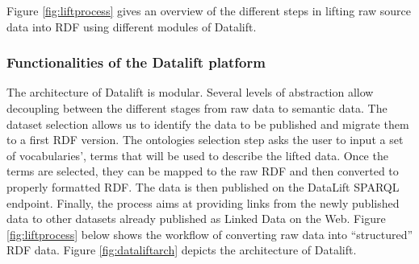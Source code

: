 \begin{itemize}
Figure \ref{fig:liftprocess} gives an overview of the different steps in lifting raw source data into RDF using different modules of Datalift. 

\begin{figure}[!htp]
\end{figure}


\subsubsection{Functionalities of the Datalift platform}

The architecture of Datalift is modular. Several levels of abstraction allow decoupling between the different stages from raw data to semantic data. The dataset selection allows us to identify the data to be published and migrate them to a first RDF version. The ontologies selection step asks the user to input a set of vocabularies', terms that will be used to describe the lifted data. Once the terms are selected, they can be mapped to the raw RDF and then converted to properly formatted RDF. The data is then published on the DataLift SPARQL endpoint. Finally, the process aims at providing links from the newly published data to other datasets already published as Linked Data on the Web. Figure \ref{fig:liftprocess} below shows the workflow of converting raw data into ``structured'' RDF data. Figure \ref{fig:dataliftarch} depicts the architecture of Datalift.


\end{itemize}
